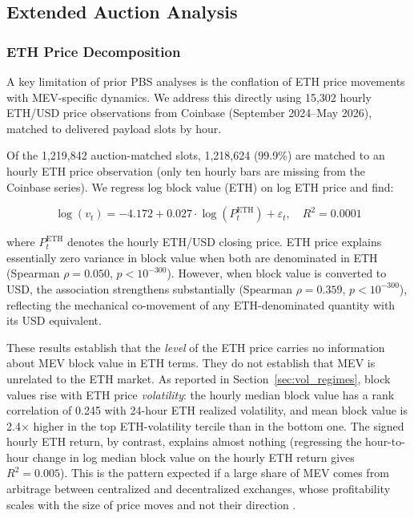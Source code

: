 \documentclass[11pt]{article}
\begin{document}
\subsection{Extended Auction Analysis}
\label{sec:extended_auction}

\subsubsection{ETH Price Decomposition}
\label{sec:eth_decomp_sec}

A key limitation of prior PBS analyses is the conflation of ETH price
movements with MEV-specific dynamics. We address this directly using 15,302
hourly ETH/USD price observations from Coinbase (September 2024--May 2026),
matched to delivered payload slots by hour.

Of the 1,219,842 auction-matched slots, 1,218,624 (99.9\%) are matched to
an hourly ETH price observation (only ten hourly bars are missing from the
Coinbase series). We regress log block value (ETH) on log ETH
price and find:

\begin{equation}
\log(v_t) = -4.172 + 0.027 \cdot \log(P_t^{\text{ETH}}) + \varepsilon_t,
\quad R^2 = 0.0001
\label{eq:eth_decomp}
\end{equation}

where $P_t^{\text{ETH}}$ denotes the hourly ETH/USD closing price. ETH price
explains essentially zero variance in block value when both are denominated in
ETH (Spearman $\rho = 0.050$, $p < 10^{-300}$). However, when block value is
converted to USD, the association strengthens substantially (Spearman $\rho =
0.359$, $p < 10^{-300}$), reflecting the mechanical co-movement of any
ETH-denominated quantity with its USD equivalent.

These results establish that the \emph{level} of the ETH price carries no
information about MEV block value in ETH terms. They do not establish that
MEV is unrelated to the ETH market. As reported in
Section~\ref{sec:vol_regimes}, block values rise with ETH price
\emph{volatility}: the hourly median block value has a rank correlation of
0.245 with 24-hour ETH realized volatility, and mean block value is
2.4$\times$ higher in the top ETH-volatility tercile than in the bottom one.
The signed hourly ETH return, by contrast, explains almost nothing (regressing
the hour-to-hour change in log median block value on the hourly ETH return
gives $R^2 = 0.005$). This is the pattern expected if a large share of MEV
comes from arbitrage between centralized and decentralized exchanges, whose
profitability scales with the size of price moves and not their direction
\citep{heimbach2024,wu2025}.
\end{document}

